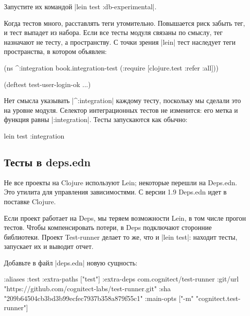 \noindent
Запустите их командой \spverb|lein test :db-experimental|.

Когда тестов много, расставлять теги утомительно. Повышается риск забыть тег, и
тест выпадет из набора. Если все тесты модуля связаны по смыслу, тег назначают
не тесту, а пространству. С точки зрения \spverb|lein| тест наследует теги
пространства, в котором объявлен:

\begin{english}
  \begin{clojure}
(ns ^:integration
  book.integration-test
  (:require [clojure.test :refer :all]))

(deftest test-user-login-ok
  ...)
  \end{clojure}
\end{english}

Нет смысла указывать \spverb|^:integration| каждому тесту, поскольку мы сделали
это на уровне модуля. Селектор интеграционных тестов не изменится: его метка и
функция равны \spverb|:integration|. Тесты запускаются как обычно:

\begin{english}
  \begin{clojure}
lein test :integration
  \end{clojure}
\end{english}

\subsection{Тесты в deps.edn}

Не все проекты на Clojure используют Lein; некоторые перешли на
Deps.edn. Это утилита для
управления зависимостями. С версии 1.9 Deps.edn идет в поставке Clojure.

Если проект работает на Deps, мы теряем возможности Lein, в том числе прогон
тестов. Чтобы компенсировать потери, в Deps подключают сторонние
библиотеки. Проект Test-runner
делает то же, что и \spverb|lein test|: находит тесты, запускает их и выводит
отчет.

Добавьте в файл \spverb|deps.edn| новую сущность:

\begin{english}
  \begin{clojure}
:aliases
{:test
 {:extra-paths ["test"]
  :extra-deps
  {com.cognitect/test-runner
   {:git/url "https://github.com/cognitect-labs/test-runner.git"
    :sha "209b64504cb3bd3b99ecfec7937b358a879f55c1"}}
  :main-opts ["-m" "cognitect.test-runner"]}}
  \end{clojure}
\end{english}

